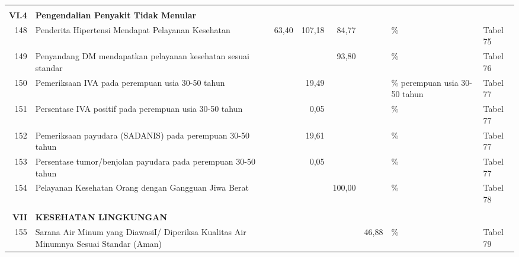 \begin{small}
\begin{longtable}{rY{12em}rrrrY{5em}Y{5em}}
	&                                                                                 &        &        &                    &          &                                &          \\
	\textbf{VI.4} & \textbf{Pengendalian Penyakit Tidak Menular}                      &        &        &                    &          &                                &          \\
	148 & Penderita Hipertensi Mendapat Pelayanan Kesehatan                           &  63,40 & 107,18 &              84,77 &          & \%                             & Tabel 75 \\
	149 & Penyandang DM  mendapatkan pelayanan kesehatan sesuai standar               &        &        &              93,80 &          & \%                             & Tabel 76 \\
	150 & Pemeriksaan IVA pada perempuan usia 30-50 tahun                             &        &  19,49 &                    &          & \% perempuan usia 30-50 tahun  & Tabel 77 \\
	151 & Persentase IVA positif pada perempuan usia 30-50 tahun                      &        &   0,05 &                    &          & \%                             & Tabel 77 \\
	152 & Pemeriksaan payudara (SADANIS) pada perempuan 30-50 tahun                   &        &  19,61 &                    &          & \%                             & Tabel 77 \\
	153 & Persentase tumor/benjolan payudara pada perempuan 30-50 tahun               &        &   0,05 &                    &          & \%                             & Tabel 77 \\
	154 & Pelayanan Kesehatan Orang dengan Gangguan Jiwa Berat                        &        &        &             100,00 &          & \%                             & Tabel 78 \\
	&                                                                                 &        &        &                    &          &                                &          \\ 
	 \textbf{VII} & \textbf{KESEHATAN LINGKUNGAN}                                     &        &        &                    &          &                                &          \\
	155 & Sarana Air Minum yang DiawasiI/ Diperiksa Kualitas Air Minumnya Sesuai Standar (Aman)&   &    &                    &    46,88 & \%                             & Tabel 79 \\

\end{longtable}
\end{small}
